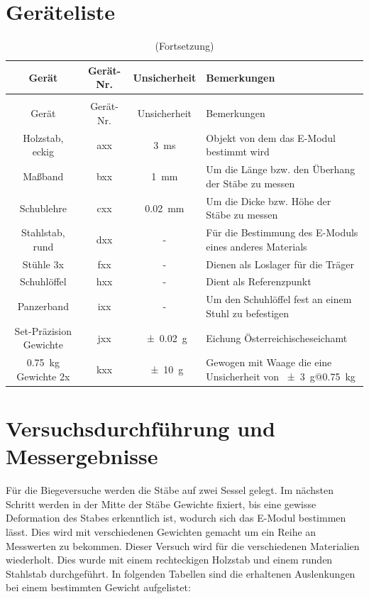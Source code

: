\documentclass[11pt,ngerman]{scrartcl}
\begin{document}
\section{Geräteliste}
\label{sec:geraeteliste}
\begin{longtable}{c|c|S|p{15em}}
\caption[Geräteliste]{Verwendete Geräte \label{tab:geraeteliste}} \\  %
\toprule
Gerät                              & Gerät-Nr. & { Unsicherheit }  & Bemerkungen \\  
\midrule
\endfirsthead
\caption[]{(Fortsetzung)}\\
\toprule
Gerät                              & Gerät-Nr. & { Unsicherheit }  & Bemerkungen \\                                                                        
\midrule
\endhead
\endfoot
\endlastfoot
        Holzstab, eckig & axx & \SI{3}{\ms}       & Objekt von dem das E-Modul bestimmt wird\\ \hline
        Maßband         & bxx & \SI{1}{\mm}       & Um die Länge bzw. den Überhang der Stäbe zu messen \\ \hline
        Schublehre      & cxx & \SI{0.02}{\mm}    & Um die Dicke bzw. Höhe der Stäbe zu messen \\ \hline
        Stahlstab, rund & dxx & { - }             & Für die Bestimmung des E-Moduls eines anderes Materials \\ \hline
        Stühle 3x       & fxx & { - }             & Dienen als Loslager für die Träger \\ \hline
        Schuhlöffel     & hxx & { - }             & Dient als Referenzpunkt \\ \hline
        Panzerband      & ixx & { - }             & Um den Schuhlöffel fest an einem Stuhl zu befestigen\\ \hline
        Set-Präzision Gewichte     & jxx & \SI{+-0.02}{\gram} & Eichung Österreichischeseichamt \\ \hline
        \SI{0.75}{\kg} Gewichte 2x & kxx & \SI{+-10}{\gram} & Gewogen mit Waage die eine Unsicherheit von \SI{+-3}{\g}@\SI{0.75}{\kg} \\ \hline

        \hline
\end{longtable}

\section{Versuchsdurchführung und Messergebnisse}
\label{sec:versuchsdurchfuehrung_messergebnisse}
Für die Biegeversuche werden die Stäbe auf zwei Sessel gelegt. Im nächsten
Schritt werden in der Mitte der Stäbe Gewichte fixiert, bis eine gewisse
Deformation des Stabes erkenntlich ist, wodurch sich das E-Modul bestimmen
lässt. Dies wird mit verschiedenen Gewichten gemacht um ein Reihe an Messwerten 
zu bekommen. Dieser Versuch wird für die verschiedenen Materialien wiederholt. 
Dies wurde mit einem rechteckigen Holzstab und einem runden Stahlstab durchgeführt.
In folgenden Tabellen sind die erhaltenen Auslenkungen bei einem bestimmten
Gewicht aufgelistet:
\end{document}
